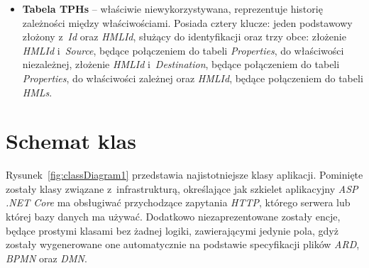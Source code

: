 \begin{itemize}
    \item \textbf{Tabela TPHs} -- właściwie niewykorzystywana, reprezentuje historię zależności między właściwościami. Posiada cztery klucze: jeden podstawowy złożony z~\emph{Id} oraz \emph{HMLId}, służący do identyfikacji oraz trzy obce: złożenie \newline \emph{HMLId} i~\emph{Source}, będące połączeniem do tabeli \emph{Properties}, do właściwości niezależnej, złożenie \emph{HMLId} i~\emph{Destination}, będące połączeniem do tabeli \emph{Properties}, do właściwości zależnej oraz \emph{HMLId}, będące połączeniem do tabeli \emph{HMLs}.
\end{itemize} 

\section{Schemat klas}
\label{sec:schematKlas}
Rysunek~\ref{fig:classDiagram1} przedstawia najistotniejsze klasy aplikacji. Pominięte zostały klasy związane z~infrastrukturą, określające jak szkielet aplikacyjny \emph{ASP .NET Core} ma obsługiwać przychodzące zapytania \emph{HTTP}, którego serwera lub której bazy danych ma używać. Dodatkowo niezaprezentowane zostały encje, będące prostymi klasami bez żadnej logiki, zawierającymi jedynie pola, gdyż zostały wygenerowane one automatycznie na podstawie specyfikacji plików \emph{ARD}, \emph{BPMN} oraz \emph{DMN}.
